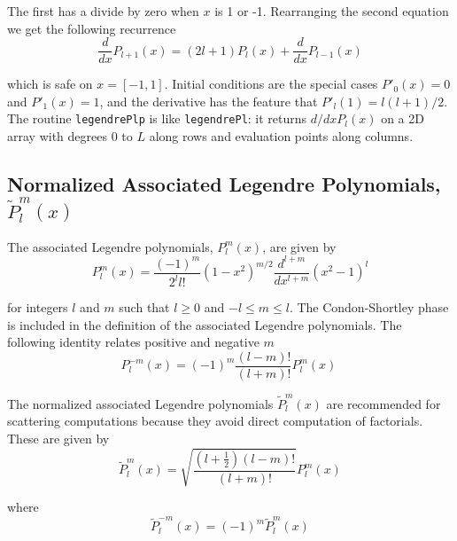 The first has a divide by zero when $x$ is 1 or -1.  Rearranging the second equation we get the following recurrence 
\begin{equation}
\dfrac{d}{dx}P_{l+1}(x) = (2l+1)P_l(x) + \dfrac{d}{dx} P_{l-1}(x)
\end{equation}

\noindent which is safe on $x=[-1, 1]$.  Initial conditions are the special cases $P'_0(x) = 0$ and $P'_1(x) = 1$, and the derivative has the feature that $P'_l(1) = l(l+1)/2$.  The routine \texttt{legendrePlp} is like \texttt{legendrePl}: it returns $d/dx P_l(x)$ on a 2D array with degrees $0$ to $L$ along rows and evaluation points along columns.  

{\footnotesize
{}
}

\clearpage
{}
\subsection{Normalized Associated Legendre Polynomials, $\widetilde{P}_l^m(x)$}


The associated Legendre polynomials, $P_l^m(x)$, are given by
\begin{equation}
P_l^m(x) = \dfrac{(-1)^m}{2^l l!} (1-x^2)^{m/2} \dfrac{d^{l+m}}{dx^{l+m}} (x^2 - 1)^l \label{plm}
\end{equation}

\noindent for integers $l$ and $m$ such that $l \ge 0$ and $-l \le m \le l$.  The Condon-Shortley phase is included in the definition of the associated Legendre polynomials. The following identity relates positive and negative $m$
\begin{equation}
P_l^{-m}(x) = (-1)^m \dfrac{(l-m)!}{(l+m)!} P_l^m(x)\
\label{eq2}
\end{equation}

The normalized associated Legendre polynomials $\widetilde P_l^m(x)$ are recommended for scattering computations because they avoid direct computation of factorials. These are given by
\begin{equation}
\widetilde P_l^m(x) = \sqrt{\dfrac{(l + \frac{1}{2})(l-m)!}{(l+m)!}} P_l^m(x) \label{plmnorm}
\end{equation}

\noindent where
\begin{equation}
\widetilde P_l^{-m}(x) = (-1)^m \widetilde{P}_l^m(x)
\end{equation}

